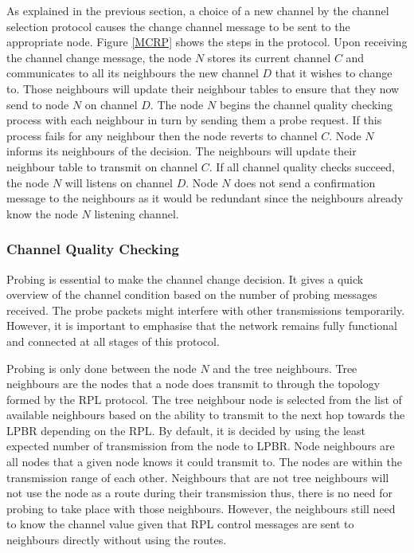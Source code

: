 As explained in the previous section, a choice of a new channel by the channel selection protocol causes the change channel message to be sent to the appropriate node. Figure \ref{MCRP} shows the steps in the protocol.
Upon receiving the channel change message, the node $N$ stores its current channel $C$ and communicates to all its neighbours the new channel $D$ that it wishes to change to. Those neighbours will update their neighbour tables to ensure that they now send to node $N$ on channel $D$.  The node $N$ begins the channel quality checking process with each neighbour in turn by sending them a probe request. If this process fails for any neighbour then the node reverts to channel $C$. Node $N$ informs its neighbours of the decision. The neighbours will update their neighbour table to transmit on channel $C$. If all channel quality checks succeed, the node $N$ will listens on channel $D$. Node $N$ does not send a confirmation message to the neighbours as it would be redundant since the neighbours already know the node $N$ listening channel. 

\subsubsection{Channel Quality Checking}
Probing is essential to make the channel change decision. It gives a quick overview of the channel condition based on the number of probing messages received. The probe packets might interfere with other transmissions temporarily. However, it is important to emphasise that the network remains fully functional and connected at all stages of this protocol.

Probing is only done between the node $N$ and the tree neighbours. Tree neighbours are the nodes that a node does transmit to through the topology formed by the RPL protocol. The tree neighbour node is selected from the list of available neighbours based on the ability to transmit to the next hop towards the LPBR depending on the RPL. By default, it is decided by using the least expected number of transmission from the node to LPBR. Node neighbours are all nodes that a given node knows it could transmit to. The nodes are within the transmission range of each other.
Neighbours that are not tree neighbours will not use the node as a route during their transmission thus, there is no need for probing to take place with those neighbours. However, the neighbours still need to know the channel value given that RPL control messages are sent to neighbours directly without using the routes.

